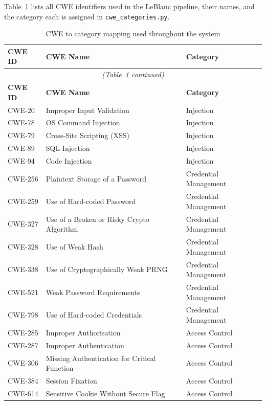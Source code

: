 \documentclass[12pt,a4paper]{report}
\begin{document}
Table~\ref{tab:cwemap} lists all CWE identifiers used in the LeBlanc pipeline,
their names, and the category each is assigned in \texttt{cwe\_categories.py}.

\begin{longtable}{@{}lll@{}}
\caption{CWE to category mapping used throughout the system}
\label{tab:cwemap} \\
\toprule
\textbf{CWE ID} & \textbf{CWE Name} & \textbf{Category} \\
\midrule
\endfirsthead
\multicolumn{3}{c}{\small\itshape (Table~\ref{tab:cwemap} continued)} \\
\toprule
\textbf{CWE ID} & \textbf{CWE Name} & \textbf{Category} \\
\midrule
\endhead
\bottomrule
\endlastfoot
CWE-20  & Improper Input Validation              & Injection \\
CWE-78  & OS Command Injection                   & Injection \\
CWE-79  & Cross-Site Scripting (XSS)             & Injection \\
CWE-89  & SQL Injection                          & Injection \\
CWE-94  & Code Injection                         & Injection \\
CWE-256 & Plaintext Storage of a Password        & Credential Management \\
CWE-259 & Use of Hard-coded Password             & Credential Management \\
CWE-327 & Use of a Broken or Risky Crypto Algorithm & Credential Management \\
CWE-328 & Use of Weak Hash                       & Credential Management \\
CWE-338 & Use of Cryptographically Weak PRNG     & Credential Management \\
CWE-521 & Weak Password Requirements             & Credential Management \\
CWE-798 & Use of Hard-coded Credentials          & Credential Management \\
CWE-285 & Improper Authorisation                 & Access Control \\
CWE-287 & Improper Authentication                & Access Control \\
CWE-306 & Missing Authentication for Critical Function & Access Control \\
CWE-384 & Session Fixation                       & Access Control \\
CWE-614 & Sensitive Cookie Without Secure Flag   & Access Control \\

\end{longtable}
\end{document}
